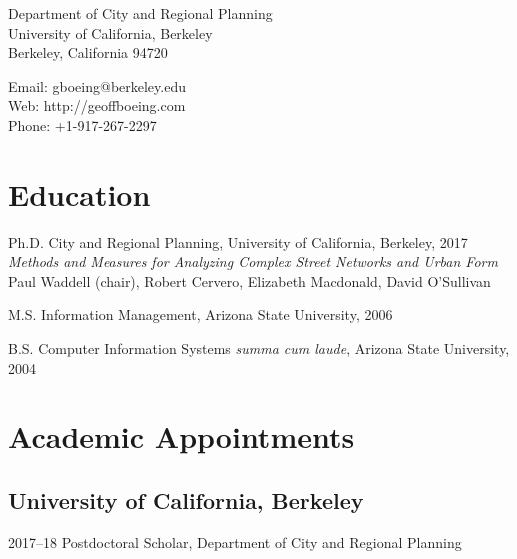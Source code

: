 \documentclass{academiccv}
\begin{document}
\raggedright

\namefont{\myname}

\vspace{1em}
\begin{minipage}[t]{0.495\textwidth}
  Department of City and Regional Planning \\
  University of California, Berkeley \\
  Berkeley, California 94720
\end{minipage}
\begin{minipage}[t]{0.495\textwidth}
  Email: gboeing@berkeley.edu \\
  Web: http://geoffboeing.com \\
  Phone: +1-917-267-2297
\end{minipage}
\vspace{0.5em}



\section*{Education}

\begin{tablist}
	
\item[Ph.D.] \tab City and Regional Planning, University of California, Berkeley, 2017 \\
                  \textit{Methods and Measures for Analyzing Complex Street Networks and Urban Form} \\
                  Paul Waddell (chair), Robert Cervero, Elizabeth Macdonald, David O'Sullivan
                  
\item[M.S.]  \tab Information Management, Arizona State University, 2006

\item[B.S.]  \tab Computer Information Systems \textit{summa cum laude}, Arizona State University, 2004

\end{tablist}



\section*{Academic Appointments}
	
\subsection*{University of California, Berkeley}
\begin{tablist} 
	\item[2017--18] \tab Postdoctoral Scholar, Department of City and Regional Planning
\end{tablist}
\end{document}
